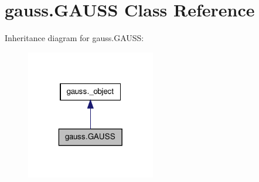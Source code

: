 \hypertarget{classgauss_1_1_g_a_u_s_s}{\section{gauss.\-G\-A\-U\-S\-S Class Reference}
\label{classgauss_1_1_g_a_u_s_s}
}


Inheritance diagram for gauss.\-G\-A\-U\-S\-S\-:\nopagebreak
\begin{figure}[H]
\begin{center}
\leavevmode
\includegraphics[width=160pt]{classgauss_1_1_g_a_u_s_s__inherit__graph}
\end{center}
\end{figure}
